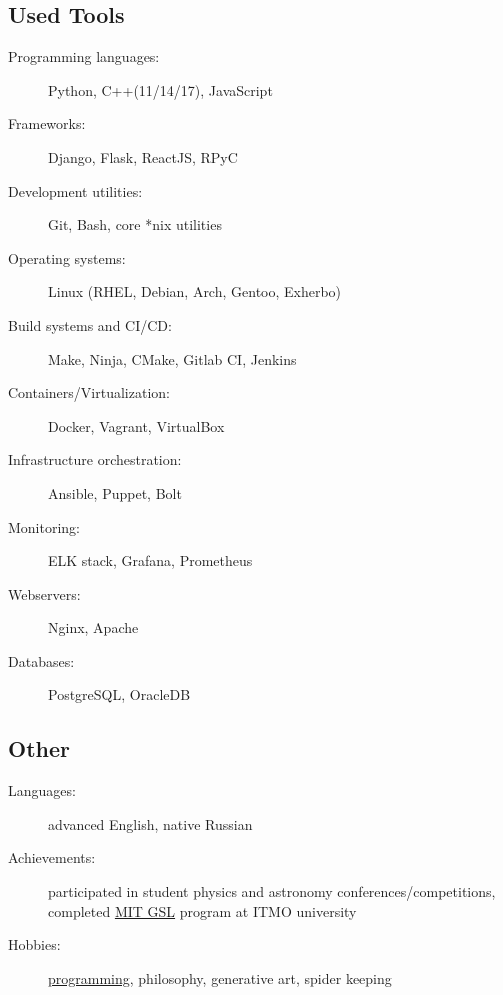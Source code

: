 \documentclass[11pt]{report}
\begin{document}
\goodbreak

\subsection*{Used Tools}
\begin{description}
    \item[Programming languages:]
    Python, C++(11/14/17), JavaScript
    \item[Frameworks:]
    Django, Flask, ReactJS, RPyC
    \item[Development utilities:]
    Git, Bash, core *nix utilities
    \item[Operating systems:]
    Linux (RHEL, Debian, Arch, Gentoo, Exherbo)
    \item[Build systems and CI/CD:]
    Make, Ninja, CMake, Gitlab CI, Jenkins
    \item[Containers/Virtualization:]
    Docker, Vagrant, VirtualBox
    \item[Infrastructure orchestration:]
    Ansible, Puppet, Bolt
    \item[Monitoring:]
    ELK stack, Grafana, Prometheus
    \item[Webservers:]
    Nginx, Apache
    \item[Databases:]
    PostgreSQL, OracleDB
\end{description}

\subsection*{Other}
\begin{description}
    \item[Languages:]
    advanced English, native Russian
    \item[Achievements:]
    participated in student physics and astronomy conferences/competitions,
    completed \href{https://gsl.mit.edu/}{MIT GSL} program at ITMO university
    \item[Hobbies:]
    \href{https://github.com/unsip}{programming}, philosophy, generative art, spider keeping
\end{description}
\end{document}
